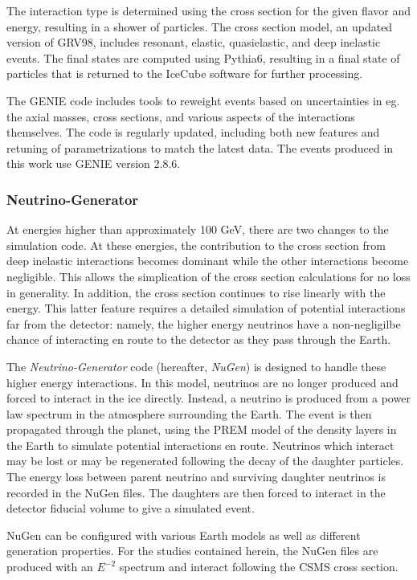 The interaction type is determined using the cross section for the given flavor and energy, resulting in a shower of particles.
The cross section model, an updated version of GRV98, includes resonant, elastic, quasielastic, and deep inelastic events.
The final states are computed using Pythia6, resulting in a final state of particles that is returned to the IceCube software for further processing.

The GENIE code includes tools to reweight events based on uncertainties in eg. the axial masses, cross sections, and various aspects of the interactions themselves. 
The code is regularly updated, including both new features and retuning of parametrizations to match the latest data.
The events produced in this work use GENIE version 2.8.6.

\label{subsubsec:nugen}
\subsubsection{Neutrino-Generator}
At energies higher than approximately 100 GeV, there are two changes to the simulation code.
At these energies, the contribution to the cross section from deep inelastic interactions becomes dominant while the other interactions become negligible. 
This allows the simplication of the cross section calculations for no loss in generality.
In addition, the cross section continues to rise linearly with the energy.
This latter feature requires a detailed simulation of potential interactions far from the detector: namely, the higher energy neutrinos have a non-negligilbe chance of interacting en route to the detector as they pass through the Earth.

The \emph{Neutrino-Generator} code (hereafter, \emph{NuGen}) is designed to handle these higher energy interactions.
In this model, neutrinos are no longer produced and forced to interact in the ice directly.
Instead, a neutrino is produced from a power law spectrum in the atmosphere surrounding the Earth.
The event is then propagated through the planet, using the PREM model of the density layers in the Earth to simulate potential interactions en route. 
Neutrinos which interact may be lost or may be regenerated following the decay of the daughter particles.
The energy loss between parent neutrino and surviving daughter neutrinos is recorded in the NuGen files.
The daughters are then forced to interact in the detector fiducial volume to give a simulated event.

NuGen can be configured with various Earth models as well as different generation properties. 
For the studies contained herein, the NuGen files are produced with an $E^{-2}$ spectrum and interact following the CSMS cross section.

